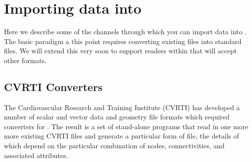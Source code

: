 %
%
%
%
%

\section{Importing data into \sr{}}
\label{sec:import} 

Here we describe some of the channels through which you can import data
into \sr{}.  The basic paradigm a this point requires converting existing
files into standard \sr{} files.  We will extend this very soon to support
readers within \sr{} that will accept other formats.


\subsection{CVRTI Converters}

The Cardiovascular Research and Training Institute (CVRTI) has developed a
number of scalar and vector data and geometry file formats which required
converters for \sr{}.  The result is a set of stand-alone programs that read
in one more more existing CVRTI files and generate a particular form of
\sr{} file, the details of which depend on the particular combination of
nodes, connectivities, and associated attributes.

